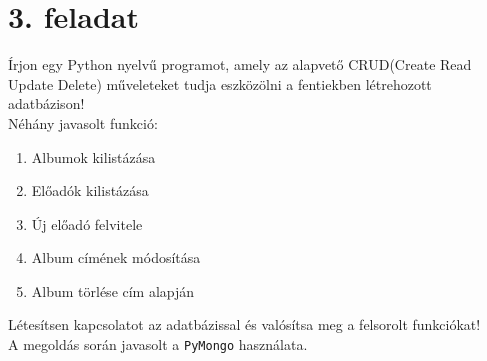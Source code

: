 \documentclass[a4paper, 12pt]{article}
\begin{document}
\section*{3. feladat}
Írjon egy Python nyelvű programot, amely az alapvető CRUD(Create Read Update Delete) műveleteket tudja eszközölni a fentiekben létrehozott adatbázison!\\
Néhány javasolt funkció:
\begin{enumerate}
	\item Albumok kilistázása
	\item Előadók kilistázása
	\item Új előadó felvitele
	\item Album címének módosítása
	\item Album törlése cím alapján
\end{enumerate}
Létesítsen kapcsolatot az adatbázissal és valósítsa meg a felsorolt funkciókat!\\
A megoldás során javasolt a \texttt{PyMongo} használata.
\end{document}
